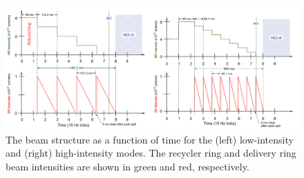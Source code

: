 %
\begin{figure}[ht!]
\begin{center}
\includegraphics[width=0.9\linewidth]{figures/BeamStructure.png}
\caption{The beam structure as a function of time for the (left) low-intensity and (right) high-intensity modes. The recycler ring and delivery ring beam intensities are shown in green and red, respectively.}
\label{fig:beam}
\end{center}
\end{figure}

